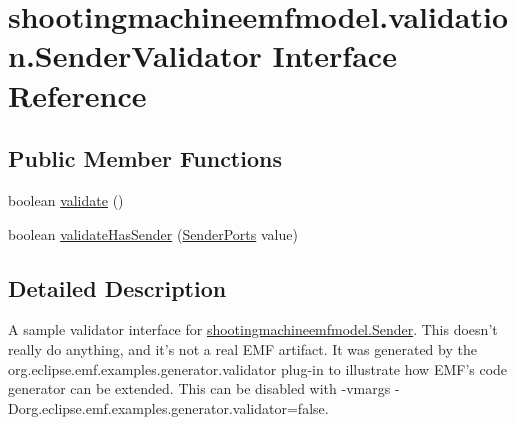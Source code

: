 \hypertarget{interfaceshootingmachineemfmodel_1_1validation_1_1_sender_validator}{\section{shootingmachineemfmodel.\-validation.\-Sender\-Validator Interface Reference}
\label{interfaceshootingmachineemfmodel_1_1validation_1_1_sender_validator}
}
\subsection*{Public Member Functions}
\begin{DoxyCompactItemize}
\item 
boolean \hyperlink{interfaceshootingmachineemfmodel_1_1validation_1_1_sender_validator_a5f40af9f236d0992b370d2e7cc029041}{validate} ()
\item 
boolean \hyperlink{interfaceshootingmachineemfmodel_1_1validation_1_1_sender_validator_a86979d1ef5686b84bce48e714c9aa6d6}{validate\-Has\-Sender} (\hyperlink{interfaceshootingmachineemfmodel_1_1_sender_ports}{Sender\-Ports} value)
\end{DoxyCompactItemize}


\subsection{Detailed Description}
A sample validator interface for \hyperlink{interfaceshootingmachineemfmodel_1_1_sender}{shootingmachineemfmodel.\-Sender}. This doesn't really do anything, and it's not a real E\-M\-F artifact. It was generated by the org.\-eclipse.\-emf.\-examples.\-generator.\-validator plug-\/in to illustrate how E\-M\-F's code generator can be extended. This can be disabled with -\/vmargs -\/\-Dorg.\-eclipse.\-emf.\-examples.\-generator.\-validator=false. 


